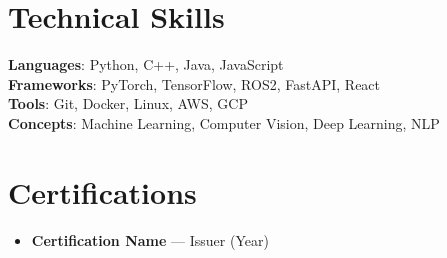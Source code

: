 \documentclass[11pt, letterpaper]{article}
\newcommand{\resumeItemListStart}{\begin{itemize}[leftmargin=0.15in, label=\textbullet]}
\newcommand{\resumeItemListEnd}{\end{itemize}\vspace{-5pt}}
\newcommand{\resumeItem}[1]{\item\small{#1 \vspace{-2pt}}}
\begin{document}
\section{Technical Skills}
\begin{itemize}[leftmargin=0.15in, label={}]
  \small{\item{
    \textbf{Languages}{: Python, C++, Java, JavaScript} \\
    \textbf{Frameworks}{: PyTorch, TensorFlow, ROS2, FastAPI, React} \\
    \textbf{Tools}{: Git, Docker, Linux, AWS, GCP} \\
    \textbf{Concepts}{: Machine Learning, Computer Vision, Deep Learning, NLP}
  }}
\end{itemize}

\section{Certifications}
\resumeItemListStart
  \resumeItem{\textbf{Certification Name} — Issuer (Year)}
\resumeItemListEnd
\end{document}
